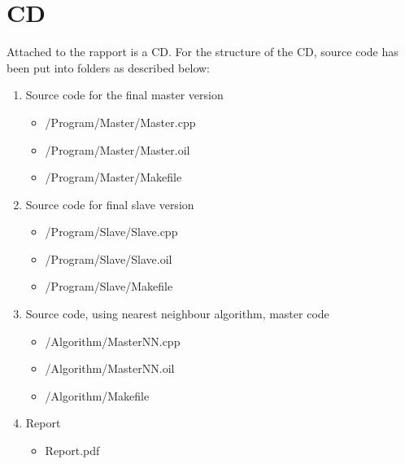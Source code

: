 \chapter{CD} \label{app:CD}
Attached to the rapport is a CD. For the structure of the CD, source code has been put into folders as described below:

\begin{enumerate}
\item Source code for the final master version
\begin{itemize}
\item /Program/Master/Master.cpp
\item /Program/Master/Master.oil 
\item /Program/Master/Makefile
\end{itemize}

\item Source code for final slave version
\begin{itemize}
\item /Program/Slave/Slave.cpp
\item /Program/Slave/Slave.oil
\item /Program/Slave/Makefile
\end{itemize}

\item Source code, using nearest neighbour algorithm, master code
\begin{itemize}
\item /Algorithm/MasterNN.cpp
\item /Algorithm/MasterNN.oil
\item /Algorithm/Makefile
\end{itemize}

\item Report
\begin{itemize}
\item Report.pdf
\end{itemize}
\end{enumerate}

